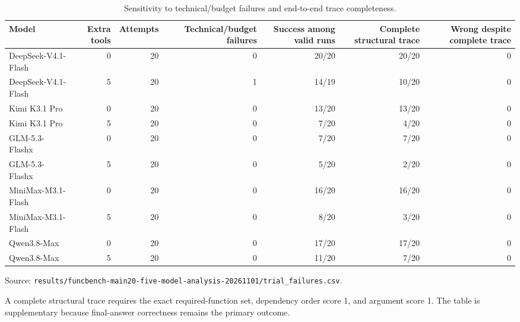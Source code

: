 \begin{table}[htbp]
\centering
\caption{Sensitivity to technical/budget failures and end-to-end trace completeness.}
\label{tab:validtrace}
\footnotesize
\setlength{\tabcolsep}{3pt}
\renewcommand{\arraystretch}{1.08}
\begin{tabularx}{\textwidth}{>{\raggedright\arraybackslash}Xrrrrrr}
\toprule
Model & Extra tools & Attempts & Technical/budget failures & Success among valid runs & Complete structural trace & Wrong despite complete trace \\
\midrule
DeepSeek-V4.1-Flash & 0 & 20 & 0 & 20/20 & 20/20 & 0 \\
DeepSeek-V4.1-Flash & 5 & 20 & 1 & 14/19 & 10/20 & 0 \\
Kimi K3.1 Pro & 0 & 20 & 0 & 13/20 & 13/20 & 0 \\
Kimi K3.1 Pro & 5 & 20 & 0 & 7/20 & 4/20 & 0 \\
GLM-5.3-Flashx & 0 & 20 & 0 & 7/20 & 7/20 & 0 \\
GLM-5.3-Flashx & 5 & 20 & 0 & 5/20 & 2/20 & 0 \\
MiniMax-M3.1-Flash & 0 & 20 & 0 & 16/20 & 16/20 & 0 \\
MiniMax-M3.1-Flash & 5 & 20 & 0 & 8/20 & 3/20 & 0 \\
Qwen3.8-Max & 0 & 20 & 0 & 17/20 & 17/20 & 0 \\
Qwen3.8-Max & 5 & 20 & 0 & 11/20 & 7/20 & 0 \\
\bottomrule
\end{tabularx}
\par\parbox{\linewidth}{\raggedright\footnotesize Source: \texttt{results/\allowbreak{}funcbench-main20-five-model-analysis-20261101/\allowbreak{}trial\_failures.csv}.}
\par\parbox{\linewidth}{\raggedright\footnotesize A complete structural trace requires the exact required-function set, dependency order score 1, and argument score 1. The table is supplementary because final-answer correctness remains the primary outcome.}
\end{table}
